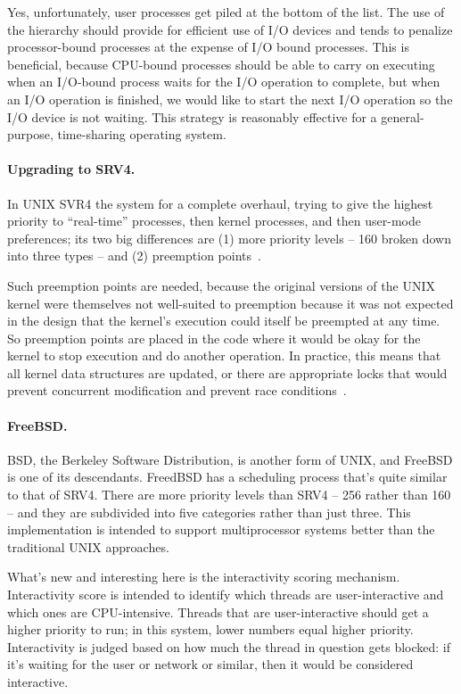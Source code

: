 Yes, unfortunately, user processes get piled at the bottom of the list. The use of the hierarchy should provide for efficient use of I/O devices and tends to penalize processor-bound processes at the expense of I/O bound processes. This is beneficial, because CPU-bound processes should be able to carry on executing when an I/O-bound process waits for the I/O operation to complete, but when an I/O operation is finished, we would like to start the next I/O operation so the I/O device is not waiting. This strategy is reasonably effective for a general-purpose, time-sharing operating system.

\paragraph{Upgrading to SRV4.}
In UNIX SVR4 the system for a complete overhaul, trying to give the highest priority to ``real-time'' processes, then kernel processes, and then user-mode preferences; its two big differences are (1) more priority levels -- 160 broken down into three types -- and (2) preemption points~\cite{osi}. 

Such preemption points are needed, because the original versions of the UNIX kernel were themselves not well-suited to preemption because it was not expected in the design that the kernel's execution could itself be preempted at any time. So preemption points are placed in the code where it would be okay for the kernel to stop execution and do another operation. In practice, this means that all kernel data structures are updated, or there are appropriate locks that would prevent concurrent modification and prevent race conditions~\cite{osi}. 

\paragraph{FreeBSD.}
BSD, the Berkeley Software Distribution, is another form of UNIX, and FreeBSD is one of its descendants. FreedBSD has a scheduling process that's quite similar to that of SRV4. There are more priority levels than SRV4 -- 256 rather than 160 -- and they are subdivided into five categories rather than just three. This implementation is intended to support multiprocessor systems better than the traditional UNIX approaches.

What's new and interesting here is the interactivity scoring mechanism. Interactivity score is intended to identify which threads are user-interactive and which ones are CPU-intensive. Threads that are user-interactive should get a higher priority to run; in this system, lower numbers equal higher priority. Interactivity is judged based on how much the thread in question gets blocked: if it's waiting for the user or network or similar, then it would be considered interactive.

